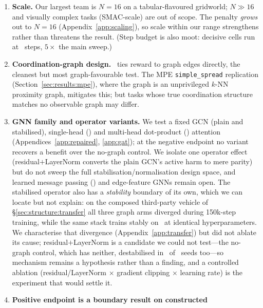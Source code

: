 \begin{enumerate}[leftmargin=*,itemsep=0pt,topsep=2pt]
  \item \textbf{Scale.} Our largest team is $N{=}16$ on a tabular-flavoured
        gridworld; $N{\gg}16$ and visually complex tasks (SMAC-scale) are
        out of scope. The penalty \emph{grows} out to $N{=}16$
        (Appendix~\ref{app:scaling}), so scale within our range strengthens
        rather than threatens the result. (Step budget is also moot:
        decisive cells run at \PEsteps\ steps, $5\times$ the main sweep.)
  \item \textbf{Coordination-graph design.} \coordgrid\ ties reward to
        graph edges directly, the cleanest but most graph-favourable
        test. The MPE \texttt{simple\_spread} replication
        (Section~\ref{sec:results:mpe}), where the graph is an unprivileged
        $k$-NN proximity graph, mitigates this; but tasks whose true
        coordination structure matches no observable graph may differ.
  \item \textbf{GNN family and operator variants.} We test a fixed
        GCN (plain and stabilised), single-head (\gatqmix) and multi-head
        dot-product (\dgnqmix) attention (Appendices~\ref{app:repaired},
        \ref{app:gat}); at the negative endpoint no variant recovers a
        benefit over the no-graph control. We isolate one operator effect
        (residual$+$LayerNorm converts the plain GCN's active harm to mere
        parity) but do not sweep the full stabilisation/normalisation design
        space, and learned message passing () and edge-feature
        GNNs remain open. The stabilised operator also has a \emph{stability}
        boundary of its own, which we can locate but not explain: on the
        composed third-party vehicle of \S\ref{sec:structure:transfer} all
        three graph arms diverged during 150k-step training, while the same
        stack trains stably on \coordgrid\ at identical hyperparameters. We
        characterise that divergence (Appendix~\ref{app:transfer}) but did not
        ablate its cause; residual$+$LayerNorm is a candidate we could not
        test---the no-graph control, which has neither, destabilised in
        \PDblowMlp\ of \PDseeds\ seeds too---so mechanism remains a hypothesis
        rather than a finding, and a controlled ablation (residual/LayerNorm
        $\times$ gradient clipping $\times$ learning rate) is the experiment
        that would settle it.
  \item \textbf{Positive endpoint is a boundary result on constructed
}
\end{enumerate}
